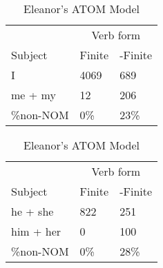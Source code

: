 \begin{table}[]
    \caption{Eleanor's ATOM Model}
    \begin{minipage}{0.5\textwidth}
    \centering
    \begin{tabular}{@{}lll@{}}
        \toprule
         &\multicolumn{2}{c}{Verb form}\\
         \cline{2-3}
        Subject & Finite & -Finite \\
        \midrule
        I & 4069 & 689 \\
        me + my & 12 & 206 \\
        \hline
        \%non-NOM & 0\% & 23\% \\
        \bottomrule
    \end{tabular}
\end{minipage}
\begin{minipage}{0.5\textwidth}
    \centering
    \begin{tabular}{@{}lll@{}}
        \toprule
         &\multicolumn{2}{c}{Verb form}\\
         \cline{2-3}
        Subject & Finite & -Finite \\
        \midrule
        he + she & 822 & 251 \\
        him + her & 0 & 100 \\
        \hline
        \%non-NOM & 0\% & 28\% \\
        \bottomrule
    \end{tabular}
    \end{minipage}
    \begin{minipage}{0.5\textwidth}
    

\end{minipage}
\end{table}
